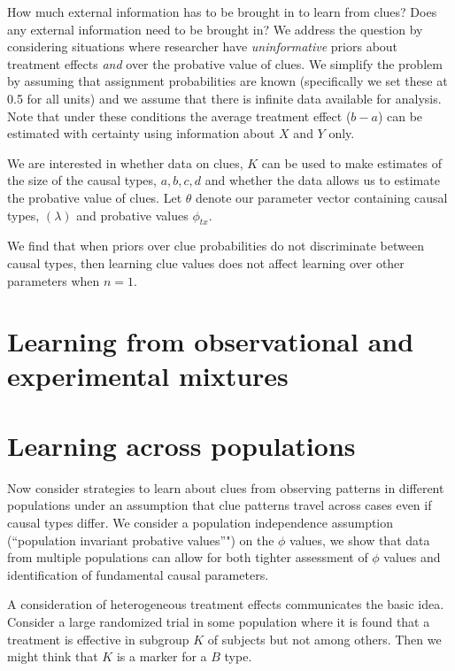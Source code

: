 \documentclass[12pt,]{book}
\begin{document}
How much external information has to be brought in to learn from clues? Does any external information need to be brought in? We address the question by considering situations where researcher have \emph{uninformative} priors about treatment effects \emph{and} over the probative value of clues. We simplify the problem by assuming that assignment probabilities are known (specifically we set these at 0.5 for all units) and we assume that there is infinite data available for analysis. Note that under these conditions the average treatment effect (\(b-a\)) can be estimated with certainty using information about \(X\) and \(Y\) only.

We are interested in whether data on clues, \(K\) can be used to make estimates of the size of the causal types, \(a,b,c,d\) and whether the data allows us to estimate the probative value of clues. Let \(\theta\) denote our parameter vector containing causal types, \((\lambda)\) and probative values \(\phi_{tx}\).

We find that when priors over clue probabilities do not discriminate between causal types, then learning clue values does not affect learning over other parameters when \(n=1\).

\hypertarget{learning-from-observational-and-experimental-mixtures}{%
\section{Learning from observational and experimental mixtures}\label{learning-from-observational-and-experimental-mixtures}}

\hypertarget{learning-across-populations}{%
\section{Learning across populations}\label{learning-across-populations}}

Now consider strategies to learn about clues from observing patterns in different populations under an assumption that clue patterns travel across cases even if causal types differ. We consider a population independence assumption (``population invariant probative values''") on the \(\phi\) values, we show that data from multiple populations can allow for both tighter assessment of \(\phi\) values and identification of fundamental causal parameters.

A consideration of heterogeneous treatment effects communicates the basic idea. Consider a large randomized trial in some population where it is found that a treatment is effective in subgroup \(K\) of subjects but not among others. Then we might think that \(K\) is a marker for a \(B\) type.
\end{document}
